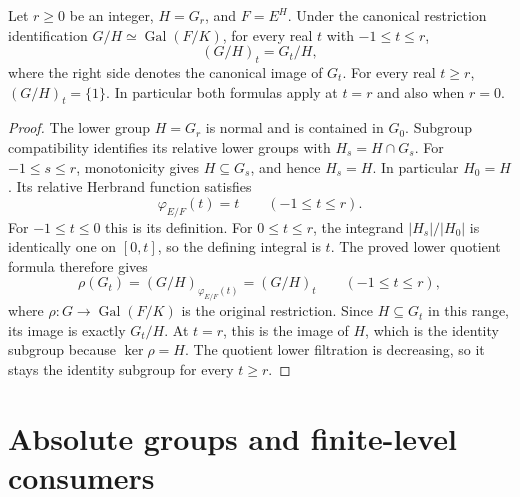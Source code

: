 \begin{corollary}
\label{fw:ramification-fixed-quotient}
\leanok
Let $r\geq0$ be an integer, $H=G_r$, and $F=E^H$.
Under the canonical restriction identification
$G/H\simeq\operatorname{Gal}(F/K)$, for every real $t$ with
$-1\leq t\leq r$,
\[
 (G/H)_t=G_t/H,
\]
where the right side denotes the canonical image of $G_t$.
For every real $t\geq r$, $(G/H)_t=\{1\}$.
In particular both formulas apply at $t=r$ and also when $r=0$.
\end{corollary}
\begin{proof}
The lower group $H=G_r$ is normal and is contained in $G_0$.
Subgroup compatibility identifies its relative lower groups with
$H_s=H\cap G_s$. For $-1\leq s\leq r$, monotonicity gives
$H\subseteq G_s$, and hence $H_s=H$. In particular $H_0=H$.
Its relative Herbrand function satisfies
\[
 \varphi_{E/F}(t)=t\qquad(-1\leq t\leq r).
\]
For $-1\leq t\leq0$ this is its definition. For $0\leq t\leq r$,
the integrand $|H_s|/|H_0|$ is identically one on $[0,t]$, so the
defining integral is $t$. The proved lower quotient formula therefore
gives
\[
 \rho(G_t)=(G/H)_{\varphi_{E/F}(t)}=(G/H)_t
 \qquad(-1\leq t\leq r),
\]
where $\rho:G\to\operatorname{Gal}(F/K)$ is the original restriction.
Since $H\subseteq G_t$ in this range, its image is exactly $G_t/H$.
At $t=r$, this is the image of $H$, which is the identity subgroup
because $\ker\rho=H$. The quotient lower filtration is decreasing,
so it stays the identity subgroup for every $t\geq r$.
\end{proof}

\section{Absolute groups and finite-level consumers}

